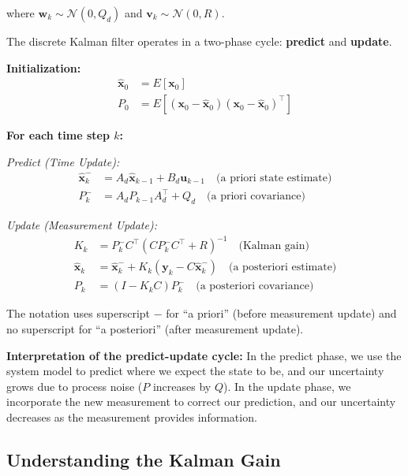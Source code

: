 where $\mathbf{w}_k \sim \mathcal{N}(0, Q_d)$ and $\mathbf{v}_k \sim \mathcal{N}(0, R)$.

The discrete Kalman filter operates in a two-phase cycle: \textbf{predict} and \textbf{update}.

\begin{tcolorbox}[colback=green!5!white,colframe=green!75!black,title=Discrete-Time Kalman Filter Algorithm,sharp corners]
\textbf{Initialization:}
\begin{align*}
\hat{\mathbf{x}}_0 &= E[\mathbf{x}_0] \\
P_0 &= E[(\mathbf{x}_0 - \hat{\mathbf{x}}_0)(\mathbf{x}_0 - \hat{\mathbf{x}}_0)^\top]
\end{align*}

\textbf{For each time step $k$:}

\textit{Predict (Time Update):}
\begin{align*}
\hat{\mathbf{x}}_k^- &= A_d\hat{\mathbf{x}}_{k-1} + B_d\mathbf{u}_{k-1} \quad \text{(a priori state estimate)} \\
P_k^- &= A_d P_{k-1} A_d^\top + Q_d \quad \text{(a priori covariance)}
\end{align*}

\textit{Update (Measurement Update):}
\begin{align*}
K_k &= P_k^- C^\top (CP_k^-C^\top + R)^{-1} \quad \text{(Kalman gain)} \\
\hat{\mathbf{x}}_k &= \hat{\mathbf{x}}_k^- + K_k(\mathbf{y}_k - C\hat{\mathbf{x}}_k^-) \quad \text{(a posteriori estimate)} \\
P_k &= (I - K_kC)P_k^- \quad \text{(a posteriori covariance)}
\end{align*}
\end{tcolorbox}

The notation uses superscript $-$ for ``a priori'' (before measurement update) and no superscript for ``a posteriori'' (after measurement update).

\textbf{Interpretation of the predict-update cycle:} In the predict phase, we use the system model to predict where we expect the state to be, and our uncertainty grows due to process noise ($P$ increases by $Q$). In the update phase, we incorporate the new measurement to correct our prediction, and our uncertainty decreases as the measurement provides information.

\subsection{Understanding the Kalman Gain}

